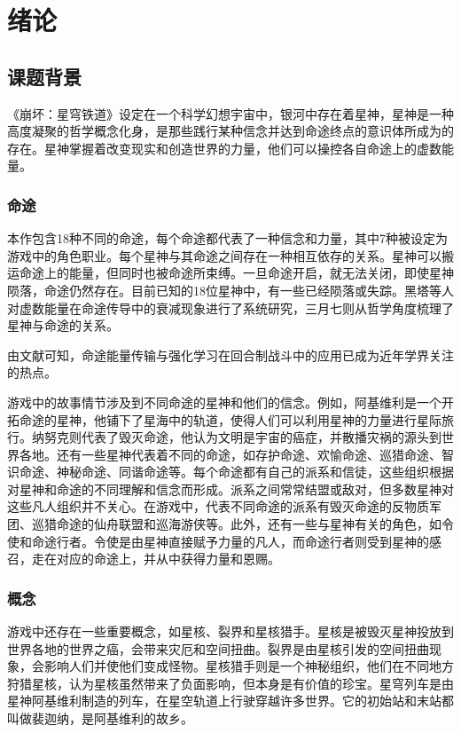 \chapter{绪论}
\vspace{7pt}


\section{课题背景}

《崩坏：星穹铁道》设定在一个科学幻想宇宙中\cite{exampleid1}，银河中存在着星神，星神是一种高度凝聚的哲学概念化身，是那些践行某种信念并达到命途终点的意识体所成为的存在。星神掌握着改变现实和创造世界的力量，他们可以操控各自命途上的虚数能量。

\subsection{命途}

本作包含18种不同的命途，每个命途都代表了一种信念和力量，其中7种被设定为游戏中的角色职业。每个星神与其命途之间存在一种相互依存的关系。星神可以搬运命途上的能量，但同时也被命途所束缚。一旦命途开启，就无法关闭，即使星神陨落，命途仍然存在。目前已知的18位星神中，有一些已经陨落或失踪。黑塔等人对虚数能量在命途传导中的衰减现象进行了系统研究\cite{exampleid2}，三月七则从哲学角度梳理了星神与命途的关系\cite{exampleid3}。

由文献可知，命途能量传输与强化学习在回合制战斗中的应用已成为近年学界关注的热点。

游戏中的故事情节涉及到不同命途的星神和他们的信念。例如，阿基维利是一个开拓命途的星神，他铺下了星海中的轨道，使得人们可以利用星神的力量进行星际旅行。纳努克则代表了毁灭命途，他认为文明是宇宙的癌症，并散播灾祸的源头到世界各地。还有一些星神代表着不同的命途，如存护命途、欢愉命途、巡猎命途、智识命途、神秘命途、同谐命途等。每个命途都有自己的派系和信徒，这些组织根据对星神和命途的不同理解和信念而形成。派系之间常常结盟或敌对，但多数星神对这些凡人组织并不关心。在游戏中，代表不同命途的派系有毁灭命途的反物质军团、巡猎命途的仙舟联盟和巡海游侠等。此外，还有一些与星神有关的角色，如令使和命途行者。令使是由星神直接赋予力量的凡人，而命途行者则受到星神的感召，走在对应的命途上，并从中获得力量和恩赐。

\subsection{概念}

游戏中还存在一些重要概念，如星核、裂界和星核猎手。星核是被毁灭星神投放到世界各地的世界之癌，会带来灾厄和空间扭曲。裂界是由星核引发的空间扭曲现象，会影响人们并使他们变成怪物。星核猎手则是一个神秘组织，他们在不同地方狩猎星核，认为星核虽然带来了负面影响，但本身是有价值的珍宝。星穹列车是由星神阿基维利制造的列车，在星空轨道上行驶穿越许多世界。它的初始站和末站都叫做裴迦纳，是阿基维利的故乡。

